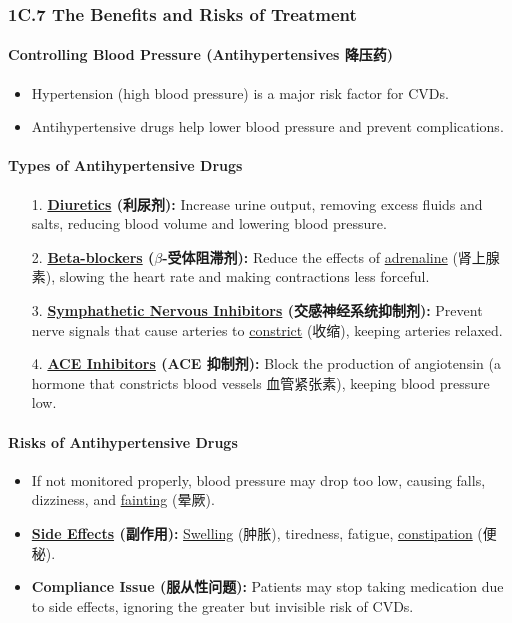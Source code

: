 
\subsubsection{1C.7 The Benefits and Risks of Treatment}
\paragraph{Controlling Blood Pressure (Antihypertensives 降压药)}
\begin{itemize}
    \item Hypertension (high blood pressure) is a major risk factor for CVDs.
    \item Antihypertensive drugs help lower blood pressure and prevent complications.
\end{itemize}

\paragraph{Types of Antihypertensive Drugs}
\begin{itemize}
    \item[1.] \textbf{\underline{Diuretics} (利尿剂):} Increase urine output, removing excess fluids and salts, reducing blood
    volume and lowering blood pressure.
    \item[2.] \textbf{\underline{Beta-blockers} ($\beta$-受体阻滞剂):} Reduce the effects of \underline{adrenaline} (肾上腺素),
    slowing the heart rate and making contractions less forceful.
    \item[3.] \textbf{\underline{Symphathetic Nervous Inhibitors} (交感神经系统抑制剂):} Prevent nerve signals that cause arteries
    to \underline{constrict} (收缩), keeping arteries relaxed.
    \item[4.] \textbf{\underline{ACE Inhibitors} (ACE 抑制剂):} Block the production of angiotensin (a hormone that constricts
    blood vessels 血管紧张素), keeping blood pressure low.
\end{itemize}

\paragraph{Risks of Antihypertensive Drugs}
\begin{itemize}
    \item If not monitored properly, blood pressure may drop too low, causing falls, dizziness, and \underline{fainting} (晕厥).
    \item \textbf{\underline{Side Effects} (副作用):} \underline{Swelling} (肿胀), tiredness, fatigue, \underline{constipation}
    (便秘).
    \item \textbf{\textbf{Compliance Issue} (服从性问题):} Patients may stop taking medication due to side effects, ignoring the 
    greater but invisible risk of CVDs.
\end{itemize}

